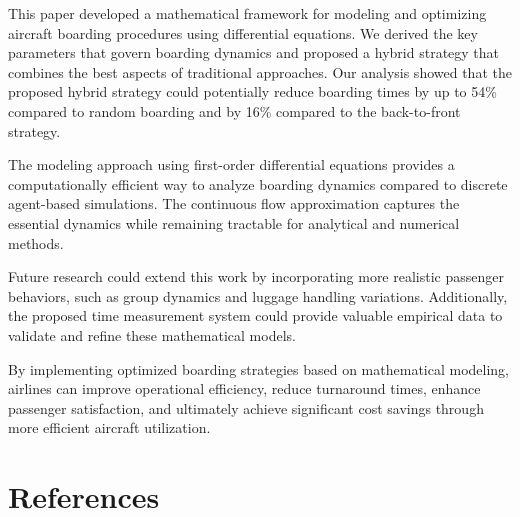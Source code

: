 \documentclass[12pt]{article}
\begin{document}
This paper developed a mathematical framework for modeling and optimizing aircraft boarding procedures using differential equations. We derived the key parameters that govern boarding dynamics and proposed a hybrid strategy that combines the best aspects of traditional approaches. Our analysis showed that the proposed hybrid strategy could potentially reduce boarding times by up to 54\% compared to random boarding and by 16\% compared to the back-to-front strategy.

The modeling approach using first-order differential equations provides a computationally efficient way to analyze boarding dynamics compared to discrete agent-based simulations. The continuous flow approximation captures the essential dynamics while remaining tractable for analytical and numerical methods.

Future research could extend this work by incorporating more realistic passenger behaviors, such as group dynamics and luggage handling variations. Additionally, the proposed time measurement system could provide valuable empirical data to validate and refine these mathematical models.

By implementing optimized boarding strategies based on mathematical modeling, airlines can improve operational efficiency, reduce turnaround times, enhance passenger satisfaction, and ultimately achieve significant cost savings through more efficient aircraft utilization.

\section*{References}
\end{document}
